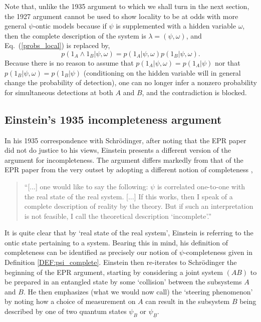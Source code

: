 \documentclass[aps,nofootinbib,12pt]{revtex4-2}
\begin{document}
Note that, unlike the 1935 argument to which we shall turn in the
next section, the 1927 argument cannot be used to show locality to
be at odds with more general $\psi$-ontic models because if $\psi$
is supplemented with a hidden variable $\omega$, then the complete
description of the system is $\lambda=(\psi,\omega)$, and
Eq.~(\ref{probs_local}) is replaced by,
\begin{equation}
p(1_{A}\wedge{1}_{B}|\psi,\omega)=p(1_{A}|\psi,\omega)p(1_{B}|\psi,\omega).
\end{equation}
Because there is no reason to assume that
$p(1_{A}|\psi,\omega)=p(1_{A}|\psi)$ nor that
$p(1_{B}|\psi,\omega)=p(1_{B}|\psi)$ (conditioning on the hidden
variable will in general change the probability of detection), one
can no longer infer a nonzero probability for simultaneous
detections at both $A$ and $B$, and the contradiction is blocked.

\subsection{Einstein's 1935 incompleteness argument\label{SEC:historical_1935}}

In his 1935 correspondence with Schr\"{o}dinger, after noting that
the EPR paper did not do justice to his views, Einstein presents a
different version of the argument for incompleteness. The argument
differs markedly from that of the EPR paper from the very outset by
adopting a different notion of completeness \cite{EtoS1935},

\begin{quote}
``[...] one would like to say the following: $\psi$ is correlated
one-to-one with the real state of the real system. [...] If this
works, then I speak of a complete description of reality by the
theory. But if such an interpretation is not feasible, I call the
theoretical description `incomplete'.''
\end{quote}

It is quite clear that by `real state of the real system', Einstein
is referring to the ontic state pertaining to a system. Bearing this
in mind, his definition of completeness can be identified as
precisely our notion of $\psi $-completeness given in Definition
\ref{DEF:psi_complete}. Einstein then re-iterates to Schr\"{o}dinger
the beginning of the EPR argument, starting by considering a joint
system $(AB)$ to be prepared in an entangled state by some
`collision' between the subsystems $A$ and $B$. He then emphasizes
(what we would now call) the `steering phenomenon' by noting how a
choice of measurement on $A$ can result in the subsystem $B$ being
described by one of two quantum states $\psi_B$ or
$\psi_{\underline{B}}$.
\end{document}
